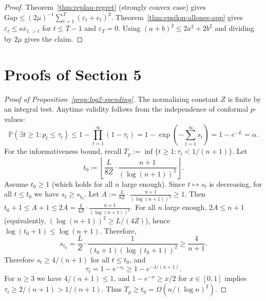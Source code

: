 \documentclass{uai2026} %
\newcommand{\1}{\mathbf{1}}
\newcommand{\prob}{\mathbb{P}}
\renewcommand{\epsilon}{\varepsilon}
\begin{document}
\begin{proof}
  Theorem~\ref{thm:replan-regret} (strongly convex case) gives
  $\mathrm{Gap}\le (2\mu)^{-1}\sum_{t=1}^{T}(\epsilon_t+e_t)^2$.
  Theorem~\ref{thm:epsilon-allones-app} gives $\epsilon_t \le \kappa \bar{e}_{t,>t}$ for $t \le T-1$ and $\epsilon_T=0$.
  Using $(a+b)^2\le 2a^2+2b^2$ and dividing by $2\mu$ gives the claim.
\end{proof}

\section{Proofs of Section 5}
\label{app:proofs_5}

  \begin{proof}[Proof of Proposition~\ref{prop:log2-spending}]
  The normalizing constant $Z$ is finite by an integral test.
  Anytime validity follows from the independence of conformal $p$-values:
  \begin{equation*}
    \prob(\exists t \ge 1 \colon p_t \le \tau_t)
    \le 1 - \prod_{t=1}^{\infty} (1 - \tau_t)
    = 1 - \exp\left(-\sum_{t=1}^{\infty} s_t\right)
    = 1 - e^{-L}
    = \alpha.
  \end{equation*}
  For the informativeness bound, recall $T_p := \inf\{t \ge 1 : \tau_t < 1/(n{+}1)\}$.
  Let
  \begin{equation*}
    t_0 \coloneqq \left\lfloor \frac{L}{8Z}\cdot \frac{n{+}1}{(\log(n{+}1))^2} \right\rfloor.
  \end{equation*}
  Assume $t_0 \ge 1$ (which holds for all $n$ large enough).
	  Since $t\mapsto s_t$ is decreasing, for all $t \le t_0$ we have $s_t \ge s_{t_0}$.
	  Let $A := \frac{L}{8Z}\cdot \frac{n{+}1}{(\log(n{+}1))^2} \ge 1$.
	  Then $t_0+1 \le A+1 \le 2A = \frac{L}{4Z}\cdot \frac{n{+}1}{(\log(n{+}1))^2}$.
	  For all $n$ large enough, $2A \le n{+}1$ (equivalently, $(\log(n{+}1))^2 \ge L/(4Z)$), hence $\log(t_0{+}1)\le \log(n{+}1)$.
	  Therefore,
	  \begin{equation*}
	    s_{t_0}
	    = \frac{L}{Z}\cdot \frac{1}{(t_0{+}1)(\log(t_0{+}1))^2}
	    \ge \frac{4}{n{+}1}.
	  \end{equation*}
  Therefore $s_t \ge 4/(n{+}1)$ for all $t \le t_0$, and
  \begin{equation*}
    \tau_t = 1-e^{-s_t} \ge 1-e^{-4/(n{+}1)}.
  \end{equation*}
  For $n \ge 3$ we have $4/(n{+}1)\le 1$, and $1-e^{-x}\ge x/2$ for $x\in[0,1]$ implies $\tau_t \ge 2/(n{+}1) > 1/(n{+}1)$.
  Thus $T_p \ge t_0 = \Omega(n/(\log n)^2)$.
\end{proof}\par\medskip
\end{document}
